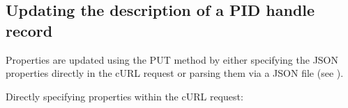 \documentclass[a4paper,10pt,english]{sphinxmanual}
\begin{document}


\subsection{Updating the description of a PID handle record}
\label{\detokenize{cookbook/handles:updating-the-description-of-a-pid-handle-record}}
Properties are updated using the PUT method by either specifying the
JSON properties directly in the cURL request or parsing them via a
JSON file (see ).

Directly specifying properties within the cURL request:

\begin{sphinxVerbatim}[commandchars=\\\{\}]

\end{sphinxVerbatim}
\end{document}
